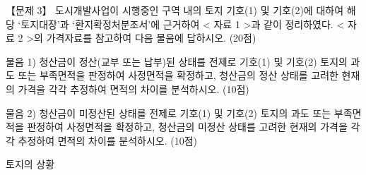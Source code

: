 \begin{longquestion}{【문제 3】}
도시개발사업이 시행중인 구역 내의 토지 기호(1) 및 기호(2)에 대하여 해당 ‘토지대장’과 ‘환지확정처분조서’에 근거하여 < 자료 1 >과 같이 정리하였다. < 자료 2 >의 가격자료를 참고하여 다음 물음에 답하시오. (20점) \par
\medskip\noindent 물음 1) 청산금이 정산(교부 또는 납부)된 상태를 전제로 기호(1) 및 기호(2) 토지의 과도 또는 부족면적을 판정하여 사정면적을 확정하고, 청산금의 정산 상태를 고려한 현재의 가격을 각각 추정하여 면적의 차이를 분석하시오. (10점) \par
\medskip\noindent 물음 2) 청산금이 미정산된 상태를 전제로 기호(1) 및 기호(2) 토지의 과도 또는 부족면적을 판정하여 사정면적을 확정하고, 청산금의 미정산 상태를 고려한 현재의 가격을 각각 추정하여 면적의 차이를 분석하시오. (10점) \par
\medskip{} 토지의 상황 \par
{\small\centering
{}\par}


\end{longquestion}
